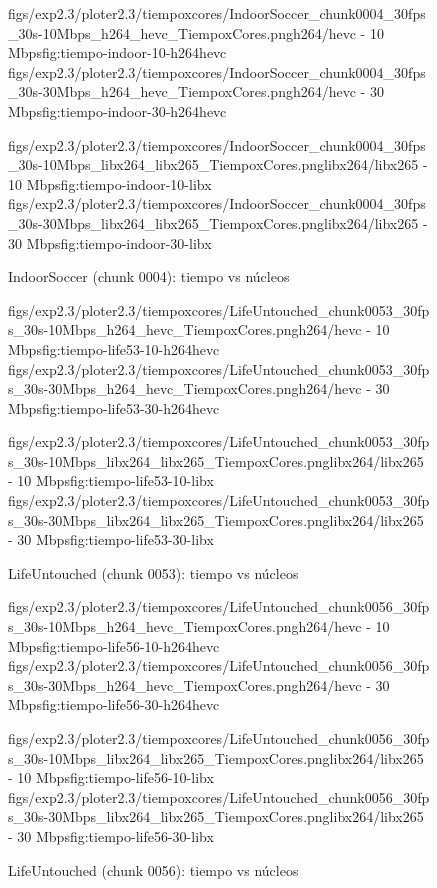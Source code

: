\begin{figure}[H]
  \centering
  \small
  \dosubfigs
    {figs/exp2.3/ploter2.3/tiempoxcores/IndoorSoccer_chunk0004_30fps_30s-10Mbps_h264_hevc_TiempoxCores.png}{h264/hevc - 10 Mbps}{fig:tiempo-indoor-10-h264hevc}
    {figs/exp2.3/ploter2.3/tiempoxcores/IndoorSoccer_chunk0004_30fps_30s-30Mbps_h264_hevc_TiempoxCores.png}{h264/hevc - 30 Mbps}{fig:tiempo-indoor-30-h264hevc}
  
  \dosubfigs
    {figs/exp2.3/ploter2.3/tiempoxcores/IndoorSoccer_chunk0004_30fps_30s-10Mbps_libx264_libx265_TiempoxCores.png}{libx264/libx265 - 10 Mbps}{fig:tiempo-indoor-10-libx}
    {figs/exp2.3/ploter2.3/tiempoxcores/IndoorSoccer_chunk0004_30fps_30s-30Mbps_libx264_libx265_TiempoxCores.png}{libx264/libx265 - 30 Mbps}{fig:tiempo-indoor-30-libx}
  \caption{IndoorSoccer (chunk 0004): tiempo vs núcleos}
  \label{fig:tiempo-indoor}
\end{figure}

\begin{figure}[H]
  \centering
  \small
  \dosubfigs
    {figs/exp2.3/ploter2.3/tiempoxcores/LifeUntouched_chunk0053_30fps_30s-10Mbps_h264_hevc_TiempoxCores.png}{h264/hevc - 10 Mbps}{fig:tiempo-life53-10-h264hevc}
    {figs/exp2.3/ploter2.3/tiempoxcores/LifeUntouched_chunk0053_30fps_30s-30Mbps_h264_hevc_TiempoxCores.png}{h264/hevc - 30 Mbps}{fig:tiempo-life53-30-h264hevc}
  
  \dosubfigs
    {figs/exp2.3/ploter2.3/tiempoxcores/LifeUntouched_chunk0053_30fps_30s-10Mbps_libx264_libx265_TiempoxCores.png}{libx264/libx265 - 10 Mbps}{fig:tiempo-life53-10-libx}
    {figs/exp2.3/ploter2.3/tiempoxcores/LifeUntouched_chunk0053_30fps_30s-30Mbps_libx264_libx265_TiempoxCores.png}{libx264/libx265 - 30 Mbps}{fig:tiempo-life53-30-libx}
  \caption{LifeUntouched (chunk 0053): tiempo vs núcleos}
  \label{fig:tiempo-life53}
\end{figure}

\begin{figure}[H]
  \centering
  \small
  \dosubfigs
    {figs/exp2.3/ploter2.3/tiempoxcores/LifeUntouched_chunk0056_30fps_30s-10Mbps_h264_hevc_TiempoxCores.png}{h264/hevc - 10 Mbps}{fig:tiempo-life56-10-h264hevc}
    {figs/exp2.3/ploter2.3/tiempoxcores/LifeUntouched_chunk0056_30fps_30s-30Mbps_h264_hevc_TiempoxCores.png}{h264/hevc - 30 Mbps}{fig:tiempo-life56-30-h264hevc}
  
  \dosubfigs
    {figs/exp2.3/ploter2.3/tiempoxcores/LifeUntouched_chunk0056_30fps_30s-10Mbps_libx264_libx265_TiempoxCores.png}{libx264/libx265 - 10 Mbps}{fig:tiempo-life56-10-libx}
    {figs/exp2.3/ploter2.3/tiempoxcores/LifeUntouched_chunk0056_30fps_30s-30Mbps_libx264_libx265_TiempoxCores.png}{libx264/libx265 - 30 Mbps}{fig:tiempo-life56-30-libx}
  \caption{LifeUntouched (chunk 0056): tiempo vs núcleos}
  \label{fig:tiempo-life56}
\end{figure}

